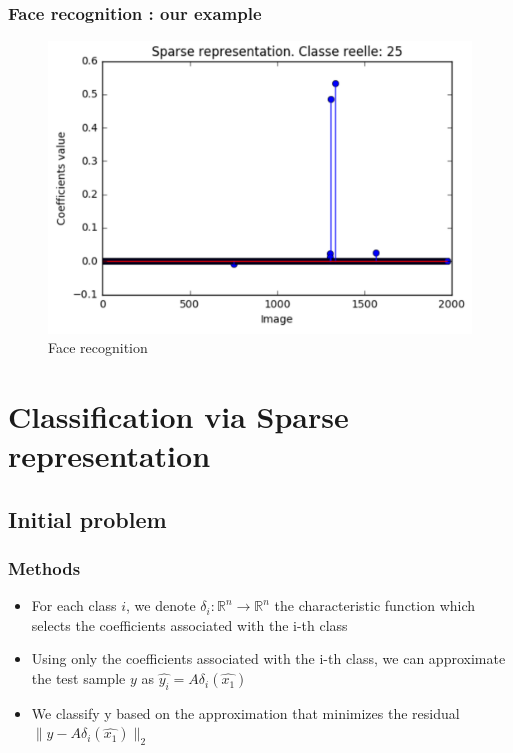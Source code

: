 \documentclass{beamer}
\begin{document}
\begin{frame}
\frametitle{Face recognition : our example}

			\begin{figure}[!ht]
			\begin{center}
			\includegraphics[scale=0.5]{sparsity.png}
			\end{center}
			\caption{Face recognition}
			\label{fa}
			\end{figure}
\end{frame}

\section{Classification via Sparse representation}

\subsection{Initial problem}

\begin{frame}

\frametitle{Methods}


	\begin{itemize}
	
\item For each class $i$, we denote $\delta_{i} : \mathbb{R}^{n} \to \mathbb{R}^{n}$ the characteristic function which selects the coefficients associated with the i-th class

\item Using only the coefficients associated with the i-th class, we can approximate the test sample $y$ as $\hat{y_{i}}=A\delta_{i}(\hat{x_{1}})$
\item We classify y based on the approximation that minimizes the residual $\|y-A\delta_{i}(\hat{x_{1}})\|_{2}$

	\end{itemize}

\end{frame}
\end{document}
